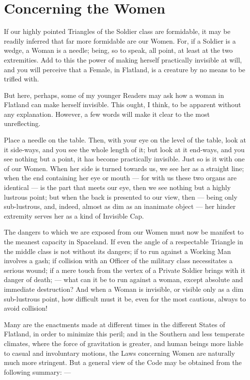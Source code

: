 \documentclass[12pt, a4paper, twoside]{memoir}
\begin{document}
\chapter{Concerning the Women}
If our highly pointed Triangles of the Soldier class are formidable, it may be
readily inferred that far more formidable are our Women. For, if a Soldier is
a wedge, a Woman is a needle; being, so to speak, all point, at least at the
two extremities. Add to this the power of making herself practically invisible
at will, and you will perceive that a Female, in Flatland, is a creature by no
means to be trifled with.

But here, perhaps, some of my younger Readers may ask how a woman in Flatland
can make herself invisible. This ought, I think, to be apparent without any
explanation. However, a few words will make it clear to the most unreflecting.

Place a needle on the table. Then, with your eye on the level of the table,
look at it side-ways, and you see the whole length of it; but look at it
end-ways, and you see nothing but a point, it has become practically
invisible. Just so is it with one of our Women. When her side is turned
towards us, we see her as a straight line; when the end containing her eye or
mouth --- for with us these two organs are identical --- is the part that meets
our eye, then we see nothing but a highly lustrous point; but when the back is
presented to our view, then --- being only sub-lustrous, and, indeed, almost as
dim as an inanimate object --- her hinder extremity serves her as a kind of
Invisible Cap.

The dangers to which we are exposed from our Women must now be manifest to the
meanest capacity in Spaceland. If even the angle of a respectable Triangle in
the middle class is not without its dangers; if to run against a Working Man
involves a gash; if collision with an Officer of the military class
necessitates a serious wound; if a mere touch from the vertex of a Private
Soldier brings with it danger of death; --- what can it be to run against a
woman, except absolute and immediate destruction? And when a Woman is
invisible, or visible only as a dim sub-lustrous point, how difficult must it
be, even for the most cautious, always to avoid collision!

Many are the enactments made at different times in the different States of
Flatland, in order to minimize this peril; and in the Southern and less
temperate climates, where the force of gravitation is greater, and human
beings more liable to casual and involuntary motions, the Laws concerning
Women are naturally much more stringent. But a general view of the Code may be
obtained from the following summary: ---
\end{document}
